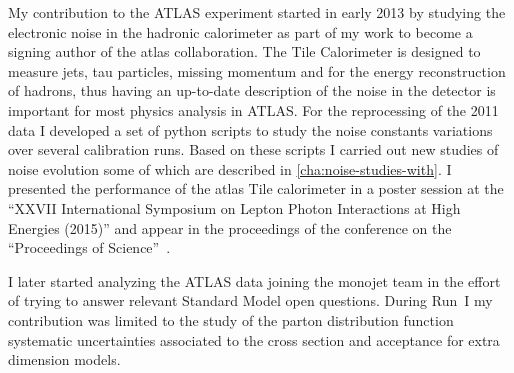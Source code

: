 My contribution to the ATLAS experiment started in early 2013 by studying the
electronic noise in the hadronic calorimeter as part of my work to become a
signing author of the \gls{atlas} collaboration. The Tile Calorimeter is
designed to measure jets, tau particles, missing momentum and for the energy
reconstruction of hadrons, thus having an up-to-date description of the noise in
the detector is important for most physics analysis in ATLAS\@. For the
reprocessing of the 2011 data I developed a set of python scripts to study the
noise constants variations over several calibration runs. Based on these scripts
I carried out new studies of noise evolution some of which are described in
\cref{cha:noise-studies-with}. I presented the performance of the \gls{atlas}
Tile calorimeter in a poster session at the ``XXVII International Symposium on
Lepton Photon Interactions at High Energies (2015)'' and appear in the
proceedings of the conference on the ``Proceedings of
Science''~\cite{TileCalPerformanceBertoli}.

I later started analyzing the ATLAS data joining the monojet team in the effort
of trying to answer relevant Standard Model open questions. During Run~I my
contribution was limited to the study of the parton distribution function
systematic uncertainties associated to the cross section and acceptance for
extra dimension models.

